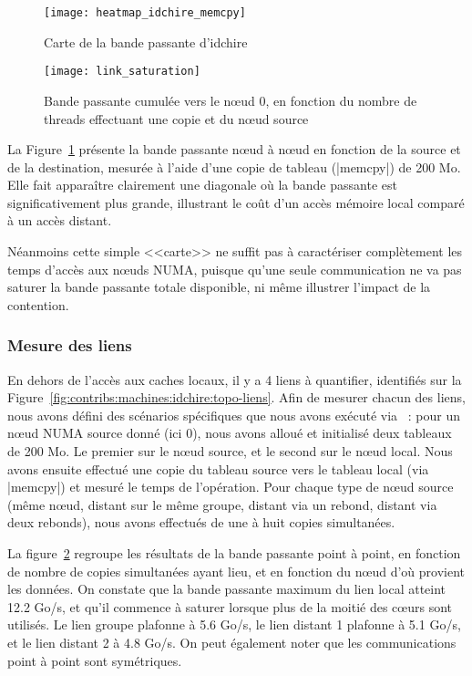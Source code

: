 \begin{figure}[t!]
  \centering
  \texttt{[image: heatmap\_idchire\_memcpy]}
  \caption{Carte de la bande passante d'idchire}\label{fig:contribs:machines:idchire:heatmap}
\end{figure}

\begin{figure}[h!]
  \centering
  \texttt{[image: link\_saturation]}
  \caption{Bande passante cumulée vers le nœud 0, en fonction du nombre de threads effectuant une copie et du nœud source}\label{fig:contribs:machines:idchire:saturation}
\end{figure}


La Figure~\ref{fig:contribs:machines:idchire:heatmap} présente la bande passante nœud à nœud en fonction de la source et de la destination, mesurée à l'aide d'une copie de tableau (|memcpy|) de 200 Mo.
Elle fait apparaître clairement une diagonale où la bande passante est significativement plus grande, illustrant le coût d'un accès mémoire local comparé à un accès distant.

Néanmoins cette simple <<carte>> ne suffit pas à caractériser complètement les temps d'accès aux nœuds NUMA, puisque qu'une seule communication ne va pas saturer la bande passante totale disponible, ni même illustrer l'impact de la contention.


\subsubsection{Mesure des liens}\label{sec:contribs:machines:idchire:liens}

En dehors de l'accès aux caches locaux, il y a 4 liens à quantifier, identifiés sur la Figure~\ref{fig:contribs:machines:idchire:topo-liens}.
Afin de mesurer chacun des liens, nous avons défini des scénarios spécifiques que nous avons exécuté via \outil~: pour un nœud NUMA source donné (ici 0), nous avons alloué et initialisé deux tableaux de 200 Mo. Le premier sur le nœud source, et le second sur le nœud local. Nous avons ensuite effectué une copie du tableau source vers le tableau local (via |memcpy|) et mesuré le temps de l'opération.
Pour chaque type de nœud source (même nœud, distant sur le même groupe, distant via un rebond, distant via deux rebonds), nous avons effectués de une à huit copies simultanées.


La figure~\ref{fig:contribs:machines:idchire:saturation} regroupe les résultats de la bande passante point à point, en fonction de nombre de copies simultanées ayant lieu, et en fonction du nœud d'où provient les données.
On constate que la bande passante maximum du lien local atteint 12.2 Go/s, et qu'il commence à saturer lorsque plus de la moitié des cœurs sont utilisés.
Le lien groupe plafonne à 5.6 Go/s, le lien distant 1 plafonne à 5.1 Go/s, et le lien distant 2 à 4.8 Go/s.
On peut également noter que les communications point à point sont symétriques.

